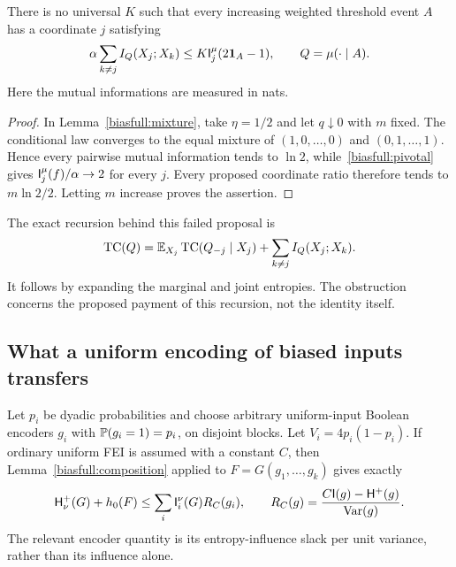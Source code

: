 \begin{proposition}
\label{biasfull:localTC}
There is no universal \(K\) such that every increasing weighted
threshold event \(A\) has a coordinate \(j\) satisfying
\[
 \alpha\sum_{k\ne j} I_Q(X_j;X_k)\le K\I_j^\mu(2\mathbf1_A-1),
 \qquad Q=\mu(\cdot\mid A).
\]
Here the mutual informations are measured in nats.
\end{proposition}
\begin{proof}
In Lemma~\ref{biasfull:mixture}, take \(\eta=1/2\) and let
\(q\downarrow0\) with \(m\) fixed.
The conditional law converges to the equal mixture of
\((1,0,\ldots,0)\) and \((0,1,\ldots,1)\).
Hence every pairwise mutual information tends to \(\ln2\),
while~\eqref{biasfull:pivotal} gives
\(\I_j^\mu(f)/\alpha\to2\) for every \(j\).
Every proposed coordinate ratio therefore tends to \(m\ln2/2\).
Letting \(m\) increase proves the assertion.
\end{proof}

The exact recursion behind this failed proposal is
\[
 \TC(Q)=\E_{X_j}\TC(Q_{-j}\mid X_j)
                  +\sum_{k\ne j}I_Q(X_j;X_k).
\]
It follows by expanding the marginal and joint entropies.
The obstruction concerns the proposed payment of this recursion,
not the identity itself.

\subsection{What a uniform encoding of biased inputs transfers}

Let \(p_i\) be dyadic probabilities and choose arbitrary uniform-input
Boolean encoders \(g_i\) with \(\P(g_i=1)=p_i\), on disjoint blocks.
Let \(V_i=4p_i(1-p_i)\).
If ordinary uniform FEI is assumed with a constant \(C\), then
Lemma~\ref{biasfull:composition} applied to \(F=G(g_1,\ldots,g_k)\)
gives exactly
\begin{equation}\label{biasfull:encoding}
 \HH_\nu^+(G)+h_0(F)
   \le\sum_i\I_i^\nu(G)R_C(g_i),\qquad
 R_C(g)=\frac{C\I(g)-\HH^+(g)}{\Var(g)}.
\end{equation}
The relevant encoder quantity is its entropy-influence slack per
unit variance, rather than its influence alone.

